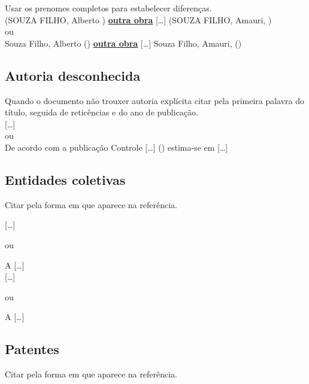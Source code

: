 Usar os prenomes completos para estabelecer diferenças. \\

 (SOUZA FILHO, Alberto \citeyear{Souza2015}) \textbf{\underline{outra obra}}   [\ldots] (SOUZA FILHO, Amauri, \citeyear{Souza2015}) \\


ou\\


Souza Filho, Alberto (\citeyear{Souza2015}) \textbf{\underline{outra obra}}   [\ldots] Souza Filho, Amauri, (\citeyear{Souza2015}) \\


\subsection{Autoria desconhecida}

Quando o documento não trouxer autoria explícita citar pela primeira palavra do título, seguida de reticências e do ano de publicação.\\

[\ldots] \cite{Controle2015}\\

ou \\

De acordo com a publicação Controle [\ldots] (\citeyear{Controle2015}) estima-se em [\ldots]\\


\subsection{Entidades coletivas}

Citar pela forma em que aparece na referência.\\
\newpage

[\ldots] \cite{Sergipe2010}

ou 

A  [\ldots] \\


[\ldots] \cite{Food2005}

ou 

A  [\ldots] \\


\subsection{Patentes}

Citar pela forma em que aparece na referência.\\

